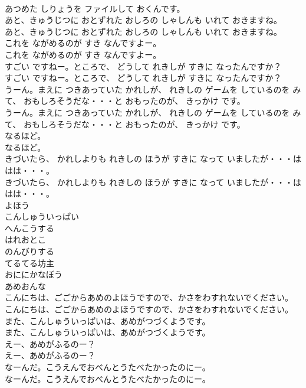 \documentclass[8pt]{extreport}
\begin{document}
\begin{CJK}{UTF8}{min}
\\	あつめた しりょうを ファイルして おくんです。
\\	あと、きゅうじつに おとずれた おしろの しゃしんも いれて おきますね。
\\	あと、きゅうじつに おとずれた おしろの しゃしんも いれて おきますね。
\\	これを ながめるのが すき なんですよー。
\\	これを ながめるのが すき なんですよー。
\\	すごい ですねー。ところで、 どうして れきしが すきに なったんですか？
\\	すごい ですねー。ところで、 どうして れきしが すきに なったんですか？
\\	うーん。まえに つきあっていた かれしが、 れきしの ゲームを しているのを みて、 おもしろそうだな・・・と おもったのが、 きっかけ です。
\\	うーん。まえに つきあっていた かれしが、 れきしの ゲームを しているのを みて、 おもしろそうだな・・・と おもったのが、 きっかけ です。
\\	なるほど。
\\	なるほど。
\\	きづいたら、 かれしよりも れきしの ほうが すきに なって いましたが・・・ははは・・・。
\\	きづいたら、 かれしよりも れきしの ほうが すきに なって いましたが・・・ははは・・・。
\\	よほう
\\	こんしゅういっぱい
\\	へんこうする
\\	はれおとこ
\\	のんびりする
\\	てるてる坊主
\\	おににかなぼう
\\	あめおんな
\\	こんにちは、ごごからあめのよほうですので、かさをわすれないでください。
\\	こんにちは、ごごからあめのよほうですので、かさをわすれないでください。
\\	また、こんしゅういっぱいは、あめがつづくようです。
\\	また、こんしゅういっぱいは、あめがつづくようです。
\\	えー、あめがふるのー？
\\	えー、あめがふるのー？
\\	なーんだ。こうえんでおべんとうたべたかったのにー。
\\	なーんだ。こうえんでおべんとうたべたかったのにー。

\end{CJK}
\end{document}
